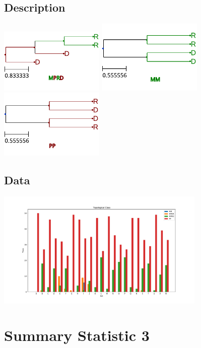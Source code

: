 \documentclass[
10pt,aspectratio=169,notheorems,hyperref={pdfauthor=whatever}
]{beamer}
\begin{document}
\subsection{Description}
\begin{frame}
  \centering
  \includegraphics[width=5cm, angle=0]{sumstat2example}
  \includegraphics[width=5cm, angle=0]{sumstat2example2}
  \includegraphics[width=5cm, angle=0]{sumstat2example3}
\end{frame}

\subsection{Data}
\begin{frame}
  \centering
  \includegraphics[width=10cm, angle=0]{sumstat2graph}
\end{frame}

\section{Summary Statistic 3}
\end{document}
